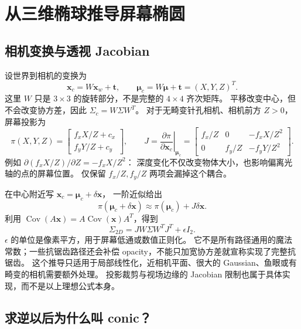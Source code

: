 \section{从三维椭球推导屏幕椭圆}

\subsection{相机变换与透视 Jacobian}

设世界到相机的变换为
\begin{equation}
 \mathbf x_c=W\mathbf x_w+\mathbf t,\qquad
 \boldsymbol\mu_c=W\boldsymbol\mu+\mathbf t=(X,Y,Z)^T.
\end{equation}
这里 $W$ 只是 $3\times3$ 的旋转部分，不是完整的 $4\times4$ 齐次矩阵。
平移改变中心，但不会改变协方差，因此
$\Sigma_c=W\Sigma W^T$。
对于无畸变针孔相机、相机前方 $Z>0$，屏幕投影为
\begin{equation}
 \pi(X,Y,Z)=
 \begin{bmatrix}f_xX/Z+c_x\\f_yY/Z+c_y\end{bmatrix},\qquad
 J=\left.\frac{\partial\pi}{\partial\mathbf x_c}\right|_{\boldsymbol\mu_c}
 =\begin{bmatrix}
 f_x/Z&0&-f_xX/Z^2\\
 0&f_y/Z&-f_yY/Z^2
 \end{bmatrix}.
\end{equation}
例如 $\partial(f_xX/Z)/\partial Z=-f_xX/Z^2$：
深度变化不仅改变物体大小，也影响偏离光轴的点的屏幕位置。
仅保留 $f_x/Z,f_y/Z$ 两项会漏掉这个耦合。

在中心附近写 $\mathbf x_c=\boldsymbol\mu_c+\delta\mathbf x$，
一阶近似给出
\begin{equation}
 \pi(\boldsymbol\mu_c+\delta\mathbf x)
 \approx\pi(\boldsymbol\mu_c)+J\delta\mathbf x.
\end{equation}
利用 $\operatorname{Cov}(A\mathbf x)=A\operatorname{Cov}(\mathbf x)A^T$，得到
\begin{equation}
 \boxed{\Sigma_{2D}=JW\Sigma W^TJ^T+\epsilon I_2.}
\end{equation}
$\epsilon$ 的单位是像素平方，用于屏幕低通或数值正则化。
它不是所有路径通用的魔法常数；一些抗锯齿路径还会补偿 opacity，不能只加宽协方差就宣称实现了完整抗锯齿。
这个推导只适用于局部线性化，近相机平面、很大的 Gaussian、鱼眼或有畸变的相机需要额外处理。
投影裁剪与视场边缘的 Jacobian 限制也属于具体实现，而不是以上理想公式本身。

\subsection{求逆以后为什么叫 conic？}

